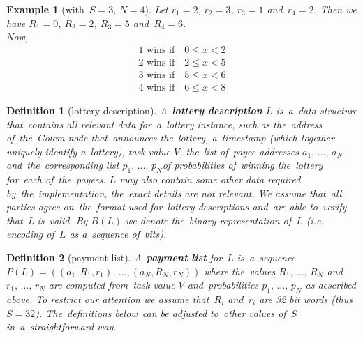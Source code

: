 \documentclass[a4paper]{article}
\newtheorem*{dfnt}{Definition}
\newtheorem*{exmp}{Example}
\begin{document}
    \begin{exmp}[with~$S=3$, $N=4$]
        Let $r_1 = 2$, $r_2 = 3$, $r_3 = 1$ and~$r_4 = 2$. Then we have $R_1 = 0$, $R_2 = 2$, $R_3 = 5$ and~$R_4 = 6$.\\
        Now,
        \begin{displaymath}
            \begin{array}{c}
                1 \text{ wins if} \quad 0 \leq x < 2\\
                2 \text{ wins if} \quad 2 \leq x < 5\\
                3 \text{ wins if} \quad 5 \leq x < 6\\
                4 \text{ wins if} \quad 6 \leq x < 8
            \end{array}
        \end{displaymath}
    \end{exmp}

    \begin{dfnt}[lottery description]
        A~\textbf{lottery description} $L$ is~a~data structure that~contains all relevant data for~a~lottery instance,
        such as the~address of~the~Golem node that~announces the~lottery, a~timestamp (which together uniquely identify
        a~lottery), task value $V$, the~list of~payee addresses $a_1,\,\ldots,\, a_N$ and~the~corresponding list
        $p_1, \,\ldots,\, p_N $of probabilities of~winning the~lottery for~each of~the~payees. $L$ may also contain
        some other data required by~the~implementation, the~exact details are not relevant. We assume that~all parties
        agree on~the~format used for~lottery descriptions and~are able to~verify that~L is~valid. By $B(L)$ we denote
        the~binary representation of~$L$ (i.e. encoding of~$L$ as a~sequence of~bits).
    \end{dfnt}


    \begin{dfnt}[payment list]
        A~\textbf{payment list} for~$L$ is~a~sequence $P(L) = ((a_1, R_1, r_1), \,\ldots, (a_N, R_N, r_N))$ where the~values
        $R_1,\,\ldots,\, R_N$ and~$r_1,\,\ldots,\, r_N$ are computed from~task value $V$ and~probabilities
        $p_1,\,\ldots,\,p_N$ as described above. To restrict our attention we assume that~$R_i$ and~$r_i$ are 32 bit
        words (thus $S = 32$). The~definitions below~can be adjusted to~other values of~$S$ in~a~straightforward way.
    \end{dfnt}
\end{document}
